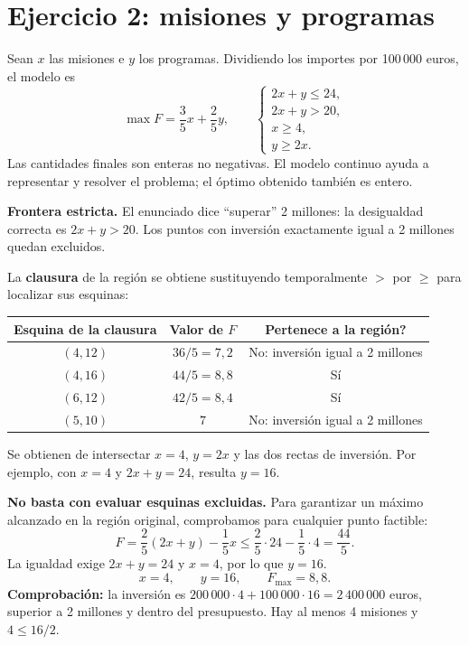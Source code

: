\documentclass[11pt]{article}
\begin{document}
\section*{Ejercicio 2: misiones y programas}
Sean $x$ las misiones e $y$ los programas. Dividiendo los importes por 100\,000 euros, el modelo es
\[
\max F=\frac35x+\frac25y,\qquad
\begin{cases}2x+y\leq24,\\2x+y>20,\\x\geq4,\\y\geq2x.\end{cases}
\]
Las cantidades finales son enteras no negativas. El modelo continuo ayuda a representar y resolver el problema; el óptimo obtenido también es entero.

\textbf{Frontera estricta.} El enunciado dice ``superar'' 2 millones: la desigualdad correcta es $2x+y>20$. Los puntos con inversión exactamente igual a 2 millones quedan excluidos.

La \textbf{clausura} de la región se obtiene sustituyendo temporalmente $>$ por $\geq$ para localizar sus esquinas:
\begin{center}
\begin{tabular}{c|c|c}
Esquina de la clausura & Valor de $F$ & \textquestiondown{}Pertenece a la región?\\\hline
$(4,12)$ & $36/5=7{,}2$ & No: inversión igual a 2 millones\\
$(4,16)$ & $44/5=8{,}8$ & Sí\\
$(6,12)$ & $42/5=8{,}4$ & Sí\\
$(5,10)$ & $7$ & No: inversión igual a 2 millones
\end{tabular}
\end{center}
Se obtienen de intersectar $x=4$, $y=2x$ y las dos rectas de inversión. Por ejemplo, con $x=4$ y $2x+y=24$, resulta $y=16$.

\textbf{No basta con evaluar esquinas excluidas.} Para garantizar un máximo alcanzado en la región original, comprobamos para cualquier punto factible:
\[
F=\frac25(2x+y)-\frac15x
\leq\frac25\cdot24-\frac15\cdot4=\frac{44}5.
\]
La igualdad exige $2x+y=24$ y $x=4$, por lo que $y=16$.
\[\boxed{x=4,\qquad y=16,\qquad F_{\max}=8{,}8}.\]
\textbf{Comprobación:} la inversión es $200\,000\cdot4+100\,000\cdot16=2\,400\,000$ euros, superior a 2 millones y dentro del presupuesto. Hay al menos 4 misiones y $4\leq16/2$.
\clearpage
\end{document}
